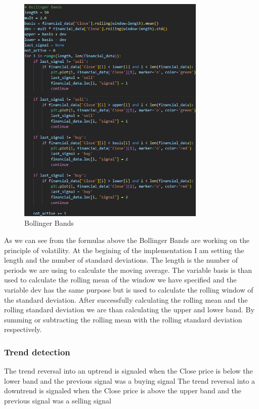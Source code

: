\documentclass{imc-inf}
\begin{document}
			\begin{figure}[h!]
				\centering
				\includegraphics[width=0.8\textwidth]{bollinger_bands_code.png}
				\caption{Bollinger Bands}
				\label{fig:bollinger_bands}

			\end{figure}
			As we can see from the formulas above the Bollinger Bands are working on the principle of volatility.
			At the begining of the implementation I am setting the length and the number of standard deviations. The length is the number of periods we are using to calculate
			the moving average. The variable basis is than used to calculate the rolling mean of the window we have specified and the variable dev 
			has the same purpose but is used to calculate the rolling window of the standard deviation.
			After successfully calculating the rolling mean and the rolling standard deviation we are than calculating the upper and lower band. By
			summing or subtracting the rolling mean with the rolling standard deviation respectively.
			
			\subsubsection{Trend detection}
				The trend reversal into an uptrend is signaled when the Close price is below the lower band and the previous signal was a buying signal
				The trend reversal into a downtrend is signaled when the Close price is above the upper band and the previous signal was a selling signal
				
\end{document}

